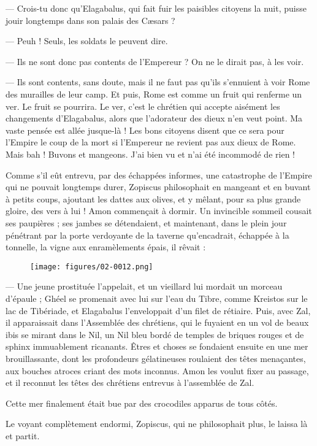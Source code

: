 \documentclass[a4paper, 11pt, oneside, polutonikogreek, french]{article}
\begin{document}
--- Crois-tu donc qu'Elagabalus, qui fait fuir les paisibles citoyens la nuit, puisse jouir longtemps dans son palais des Cæsars ?

--- Peuh ! Seuls, les soldats le peuvent dire.

--- Ils ne sont donc pas contents de l'Empereur ? On ne le dirait pas, à les voir.

--- Ils sont contents, sans doute, mais il ne faut pas qu'ils s'ennuient à voir Rome des murailles de leur camp. Et puis, Rome est comme un fruit qui renferme un ver. Le fruit se pourrira. Le ver, c'est le chrétien qui accepte aisément les changements d'Elagabalus, alors que l'adorateur des dieux n'en veut point. Ma vaste pensée est allée jusque-là ! Les bons citoyens disent que ce sera pour l'Empire le coup de la mort si l'Empereur ne revient pas aux dieux de Rome. Mais bah ! Buvons et mangeons. J'ai bien vu et n'ai été incommodé de rien !

Comme s'il eût entrevu, par des échappées informes, une catastrophe de l'Empire qui ne pouvait longtemps durer, Zopiscus philosophait en mangeant et en buvant à petits coups, ajoutant les dattes aux olives, et y mêlant, pour sa plus grande gloire, des vers à lui ! Amon commençait à dormir. Un invincible sommeil cousait ses paupières ; ses jambes se détendaient, et maintenant, dans le plein jour pénétrant par la porte verdoyante de la taverne qu'encadrait, échappée à la tonnelle, la vigne aux enramèlements épais, il rêvait :
\begin{figure}[H]
\centering
\texttt{[image: figures/02-0012.png]}
\end{figure}
--- Une jeune prostituée l'appelait, et un vieillard lui mordait un morceau d'épaule ; Ghéel se promenait avec lui sur l'eau du Tibre, comme Kreistos sur le lac de Tibériade, et Elagabalus l'enveloppait d'un filet de rétiaire. Puis, avec Zal, il apparaissait dans l'Assemblée des chrétiens, qui le fuyaient en un vol de beaux ibis se mirant dans le Nil, un Nil bleu bordé de temples de briques rouges et de sphinx immuablement ricanants. Êtres et choses se fondaient ensuite en une mer brouillassante, dont les profondeurs gélatineuses roulaient des têtes menaçantes, aux bouches atroces criant des mots inconnus. Amon les voulut fixer au passage, et il reconnut les têtes des chrétiens entrevus à l'assemblée de Zal.

Cette mer finalement était bue par des crocodiles apparus de tous côtés.

Le voyant complètement endormi, Zopiscus, qui ne philosophait plus, le laissa là et partit.
\clearpage
\end{document}

